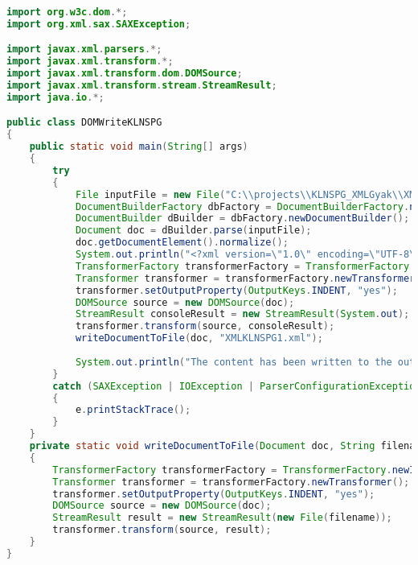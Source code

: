 \documentclass[12pt]{report}
\begin{document}
\begin{lstlisting}[caption={DOMWriteKLNSPG.java} adatíró program, language=Java]
import org.w3c.dom.*;
import org.xml.sax.SAXException;

import javax.xml.parsers.*;
import javax.xml.transform.*;
import javax.xml.transform.dom.DOMSource;
import javax.xml.transform.stream.StreamResult;
import java.io.*;

public class DOMWriteKLNSPG 
{
	public static void main(String[] args) 
	{
		try 
		{
			File inputFile = new File("C:\\projects\\KLNSPG_XMLGyak\\XMLTaskKLNSPG\\XMLKLNSPG.xml");
			DocumentBuilderFactory dbFactory = DocumentBuilderFactory.newInstance();
			DocumentBuilder dBuilder = dbFactory.newDocumentBuilder();
			Document doc = dBuilder.parse(inputFile);
			doc.getDocumentElement().normalize();
			System.out.println("<?xml version=\"1.0\" encoding=\"UTF-8\"?>");
			TransformerFactory transformerFactory = TransformerFactory.newInstance();
			Transformer transformer = transformerFactory.newTransformer();
			transformer.setOutputProperty(OutputKeys.INDENT, "yes");
			DOMSource source = new DOMSource(doc);
			StreamResult consoleResult = new StreamResult(System.out);
			transformer.transform(source, consoleResult);
			writeDocumentToFile(doc, "XMLKLNSPG1.xml");
			
			System.out.println("The content has been written to the output file successfully.");
		} 
		catch (SAXException | IOException | ParserConfigurationException | TransformerException e) 
		{
			e.printStackTrace();
		}
	}
	private static void writeDocumentToFile(Document doc, String filename) throws TransformerException 
	{
		TransformerFactory transformerFactory = TransformerFactory.newInstance();
		Transformer transformer = transformerFactory.newTransformer();
		transformer.setOutputProperty(OutputKeys.INDENT, "yes");
		DOMSource source = new DOMSource(doc);
		StreamResult result = new StreamResult(new File(filename));
		transformer.transform(source, result);
	}
}
\end{lstlisting}
\end{document}
